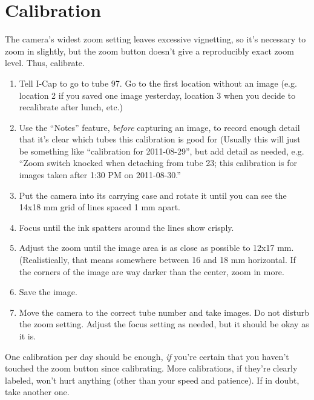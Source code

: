 \documentclass[11pt]{article}
\begin{document}
		
\section{Calibration}
	The camera's widest zoom setting leaves excessive vignetting, so it's necessary to zoom in slightly, but the zoom button doesn't give a reproducibly exact zoom level. Thus, calibrate. 
	
\begin{enumerate}
	\item{Tell I-Cap to go to tube 97. Go to the first location without an image (e.g. location 2 if you saved one image yesterday, location 3 when you decide to recalibrate after lunch, etc.)}
	\item{Use the ``Notes'' feature, \textit{before} capturing an image, to record enough detail that it's clear which tubes this calibration is good for (Usually this will just be something like ``calibration for 2011-08-29'', but add detail as needed, e.g.  ``Zoom switch knocked when detaching from tube 23; this calibration is for images taken after 1:30 PM on 2011-08-30.''}
	\item{Put the camera into its carrying case and rotate it until you can see the 14x18 mm grid of lines spaced 1 mm apart.}
	\item{Focus until the ink spatters around the lines show crisply.}
	\item{Adjust the zoom until the image area is as close as possible to 12x17 mm. (Realistically, that means somewhere between 16 and 18 mm horizontal. If the corners of the image are way darker than the center, zoom in more.}
	\item{Save the image.}
	\item{Move the camera to the correct tube number and take images. Do not disturb the zoom setting. Adjust the focus setting as needed, but it should be okay as it is.} 
\end{enumerate}
	
	One calibration per day should be enough, \textit{if} you're certain that you haven't touched the zoom button since calibrating. More calibrations, if they're clearly labeled, won't hurt anything (other than your speed and patience). If in doubt, take another one.
\end{document}
